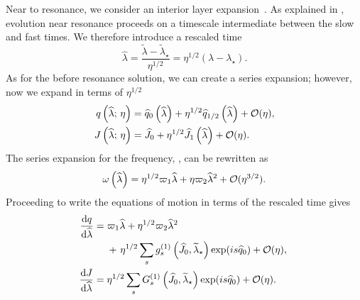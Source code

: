 Near to resonance, we consider an interior layer expansion~\cite{Kevorkian1971}. As explained in , evolution near resonance proceeds on a timescale intermediate between the slow and fast times. We therefore introduce a rescaled time
\begin{equation}
\widehat{\lambda} = \dfrac{\widetilde{\lambda} - \widetilde{\lambda}_\star}{\eta^{1/2}} = \eta^{1/2}(\lambda - \lambda_\star).
\end{equation}
As for the before resonance solution, we can create a series expansion; however, now we expand in terms of $\eta^{1/2}$~\cite{Flanagan2012}
\begin{subequations}
\begin{align}
q\left(\widehat{\lambda};\,\eta\right) = {} & \widehat{q}_0\left(\widehat{\lambda}\right) + \eta^{1/2} \widehat{q}_{1/2}\left(\widehat{\lambda}\right) + \mathcal{O}({\eta}), \\
J\left(\widehat{\lambda};\,\eta\right) = {} & \widehat{J}_0 + \eta^{1/2} \widehat{J}_1\left(\widehat{\lambda}\right) + \mathcal{O}({\eta}).
\end{align}
\end{subequations}
The series expansion for the frequency, , can be rewritten as
\begin{equation}
\omega\left(\widehat{\lambda}\right) = \eta^{1/2}\varpi_1\widehat{\lambda} + \eta\varpi_2\widehat{\lambda}^2 + \mathcal{O}({\eta^{3/2}}).
\label{eq:omega-hat}
\end{equation}
Proceeding to write the equations of motion in terms of the rescaled time gives
\begin{subequations}
\begin{align}
\dfrac{\mathrm{d} {q}}{\mathrm{d} {\widehat{\lambda}}} = {} & \varpi_1\widehat{\lambda} + \eta^{1/2}\varpi_2\widehat{\lambda}^2 \nonumber \\ 
 {} & + \left. \eta^{1/2}\sum_s g_s^{(1)}\left(\widehat{J}_0,\widetilde{\lambda}_\star\right)\exp(is \widehat{q}_0)  + \mathcal{O}({\eta}), \right. \\
\dfrac{\mathrm{d} {J}}{\mathrm{d} {\widehat{\lambda}}} = {} & \eta^{1/2}\sum_s G_s^{(1)}\left(\widehat{J}_0,\widetilde{\lambda}_\star\right)\exp(is \widehat{q}_0) + \mathcal{O}({\eta}).
\end{align}
\end{subequations}


